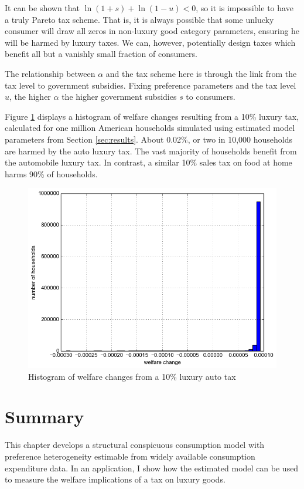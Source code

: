 It can be shown that $\ln(1+s) + \ln(1 - u) < 0$, so it is impossible to have a truly Pareto tax scheme.  That is, it is always possible that some unlucky consumer will draw all zeros in non-luxury good category parameters, ensuring he will be harmed by luxury taxes.  We can, however, potentially design taxes which benefit all but a vanishly small fraction of consumers.

The relationship between $\alpha$ and the tax scheme here is through the link from the tax level to government subsidies.  Fixing preference parameters and the tax level $u$, the higher $\alpha$ the higher government subsidies $s$ to consumers.

Figure \ref{fig:wel_change_10} displays a histogram of welfare changes resulting from a 10\% luxury tax, calculated for one million American households simulated using estimated model parameters from Section \ref{sec:results}.  About 0.02\%, or two in 10,000 households are harmed by the auto luxury tax.  The vast majority of households benefit from the automobile luxury tax.  In contrast, a similar 10\% sales tax on food at home harms 90\% of households.

\begin{figure}
    \centering
	\includegraphics[scale=.6]{pics/tax_hist_Car10.png}
    \caption{Histogram of welfare changes from a 10\% luxury auto tax}
    \label{fig:wel_change_10}
\end{figure}

\section{Summary}
This chapter develops a structural conspicuous consumption model with preference heterogeneity estimable from widely available consumption expenditure data.  In an application, I show how the estimated model can be used to measure the welfare implications of a tax on luxury goods.

